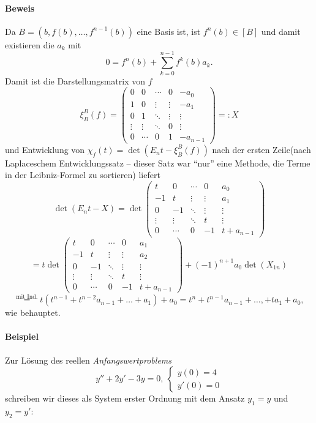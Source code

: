 \paragraph{Beweis}
	Da $ B= \left(b,f(b),\dots,f^{n-1}(b)\right) $ eine Basis ist, ist $ f^n(b)\in [B] $ und damit existieren die $ a_k $ mit
		\[ 0 = f^n(b) + \sum_{k=0}^{n-1}f^k(b)a_k. \]
	Damit ist die Darstellungsmatrix von $ f $
		\[ \xi_B^B(f) =
		\begin{pmatrix}
		0 & 0 & \cdots & 0 & -a_0 \\ 
		1 & 0 & \vdots & \vdots & -a_1 \\ 
		0 & 1 & \ddots & \vdots & \vdots \\ 
		\vdots & \vdots & \ddots & 0 & \vdots \\ 
		0 & \cdots & 0 & 1 & -a_{n-1}
		\end{pmatrix} =: X\]
	und Entwicklung von $ \chi_f(t)=\det(E_nt-\xi_B^B(f)) $ nach der ersten Zeile(nach Laplaceschem Entwicklungssatz -- dieser Satz war "`nur"' eine Methode, die Terme in der Leibniz-Formel zu sortieren) liefert
		\[ \det(E_nt-X) = \det 
		\begin{pmatrix}
		t & 0 & \cdots & 0 & a_0 \\ 
		-1 & t & \vdots & \vdots & a_1 \\ 
		0 & -1 & \ddots & \vdots & \vdots \\ 
		\vdots & \vdots & \ddots & t & \vdots \\ 
		0 & \cdots & 0 & -1 & t+a_{n-1}
		\end{pmatrix} \]
		\[ = t \det \begin{pmatrix}
		t & 0 & \cdots & 0 & a_1 \\ 
		-1 & t & \vdots & \vdots & a_2 \\ 
		0 & -1 & \ddots & \vdots & \vdots \\ 
		\vdots & \vdots & \ddots & t & \vdots \\ 
		0 & \cdots & 0 & -1 & t+a_{n-1}
		\end{pmatrix} + (-1)^{n+1} a_0 \det(X_{1n}) \]
		\[ \overset{\text{mit Ind.}}{=} t (t^{n-1}+t^{n-2}a_{n-1}+\dots+a_1)+a_0 = t^n+t^{n-1}a_{n-1}+\dots,+ta_1+a_0, \]
	wie behauptet.
	
\paragraph{Beispiel}
	Zur Lösung des reellen \emph{Anfangswertproblems}
		\[ y'' + 2y' - 3y = 0,\ 
		\begin{cases}
			y(0)=4 \\
			y'(0)=0
		\end{cases} \]
	schreiben wir dieses als System erster Ordnung mit dem Ansatz $ y_1 = y $ und $y_2 = y' $:
	

